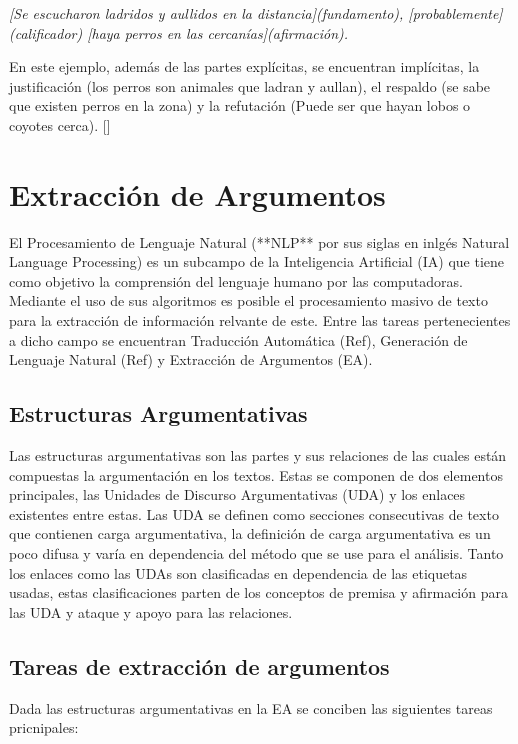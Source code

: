 \emph{[Se escucharon ladridos y aullidos en la distancia](fundamento), [probablemente](calificador) 
[haya perros en las cercanías](afirmación).}

En este ejemplo, además de las partes explícitas, se encuentran implícitas, la justificación 
(los perros son animales que ladran y aullan), el respaldo (se sabe que existen perros en la zona) y 
la refutación (Puede ser que hayan lobos o coyotes cerca). [\cite{toulminArgument}]
  
\section{Extracción de Argumentos}

El Procesamiento de Lenguaje Natural (**NLP** por sus siglas en inlgés  Natural Language Processing) es un 
subcampo de la Inteligencia Artificial (IA) que tiene como objetivo la comprensión del lenguaje humano por 
las computadoras. 
Mediante el uso de sus algoritmos es posible el procesamiento masivo de texto para la extracción de información 
relvante de este. Entre las tareas pertenecientes a dicho campo se encuentran Traducción Automática (Ref), 
Generación de Lenguaje Natural (Ref) y Extracción de Argumentos (EA).

\subsection{Estructuras Argumentativas}

Las estructuras argumentativas son las partes y sus relaciones de las cuales están compuestas la argumentación en los textos.
Estas se componen de dos elementos principales, las Unidades de Discurso Argumentativas (UDA) y los enlaces
existentes entre estas. Las UDA se definen como secciones consecutivas de texto que contienen carga argumentativa,
la definición de carga argumentativa es un poco difusa y varía en dependencia del método que se use para el análisis. 
Tanto los enlaces como las UDAs son clasificadas en dependencia de las etiquetas usadas, estas clasificaciones 
parten de los conceptos de premisa y afirmación para las UDA y ataque y apoyo para las relaciones. 

\subsection{Tareas de extracción de argumentos}

Dada las estructuras argumentativas en la EA se conciben las siguientes tareas pricnipales:


